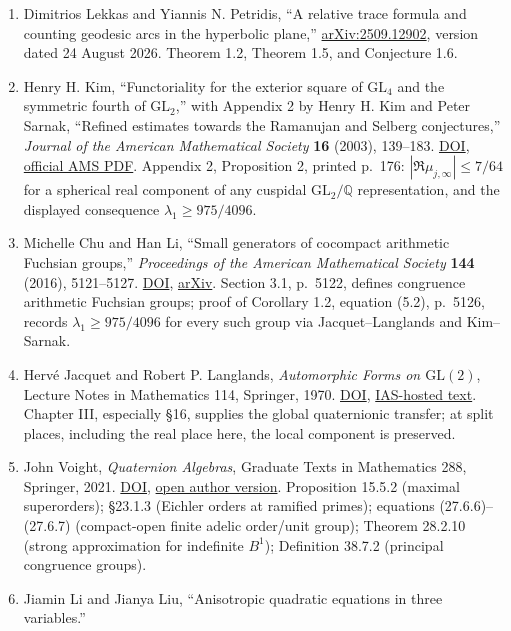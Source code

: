 \begin{enumerate}
  \href{https://arxiv.org/abs/2407.03134}{arXiv:2407.03134v3}; Theorems 3--4
  and Conjecture 1, pp.~3--4.
\item
  Dimitrios Lekkas and Yiannis N. Petridis, ``A relative trace formula and counting geodesic arcs in the hyperbolic plane,'' \href{https://arxiv.org/abs/2509.12902}{arXiv:2509.12902}, version dated 24 August 2026. Theorem 1.2, Theorem 1.5, and Conjecture 1.6.
\item
  Henry H. Kim, ``Functoriality for the exterior square of \(\mathrm{GL}_4\) and the symmetric fourth of \(\mathrm{GL}_2\),'' with Appendix 2 by Henry H. Kim and Peter Sarnak, ``Refined estimates towards the Ramanujan and Selberg conjectures,'' \emph{Journal of the American Mathematical Society} \textbf{16} (2003), 139--183. \href{https://doi.org/10.1090/S0894-0347-02-00410-1}{DOI}, \href{https://www.ams.org/journals/jams/2003-16-01/S0894-0347-02-00410-1/S0894-0347-02-00410-1.pdf}{official AMS PDF}. Appendix 2, Proposition 2, printed p.~176: \(|\Re\mu_{j,\infty}|\leq7/64\) for a spherical real component of any cuspidal \(\mathrm{GL}_2/\mathbb Q\) representation, and the displayed consequence \(\lambda_1\geq975/4096\).
\item
  Michelle Chu and Han Li, ``Small generators of cocompact arithmetic Fuchsian groups,'' \emph{Proceedings of the American Mathematical Society} \textbf{144} (2016), 5121--5127. \href{https://doi.org/10.1090/proc/13177}{DOI}, \href{https://arxiv.org/abs/1603.00926}{arXiv}. Section 3.1, p.~5122, defines congruence arithmetic Fuchsian groups; proof of Corollary 1.2, equation (5.2), p.~5126, records \(\lambda_1\geq975/4096\) for every such group via Jacquet--Langlands and Kim--Sarnak.
\item
  Hervé Jacquet and Robert P. Langlands, \emph{Automorphic Forms on \(\mathrm{GL}(2)\)}, Lecture Notes in Mathematics 114, Springer, 1970. \href{https://doi.org/10.1007/BFb0058988}{DOI}, \href{https://publications.ias.edu/sites/default/files/automorphic-forms-on-gl2_rpl_9.pdf}{IAS-hosted text}. Chapter III, especially §16, supplies the global quaternionic transfer; at split places, including the real place here, the local component is preserved.
\item
  John Voight, \emph{Quaternion Algebras}, Graduate Texts in Mathematics 288, Springer, 2021. \href{https://doi.org/10.1007/978-3-030-56694-4}{DOI}, \href{https://jvoight.github.io/quat-book.pdf}{open author version}. Proposition 15.5.2 (maximal superorders); §23.1.3 (Eichler orders at ramified primes); equations (27.6.6)--(27.6.7) (compact-open finite adelic order/unit group); Theorem 28.2.10 (strong approximation for indefinite \(B^1\)); Definition 38.7.2 (principal congruence groups).
\item
  Jiamin Li and Jianya Liu, ``Anisotropic quadratic equations in three
  variables.''


\end{enumerate}
